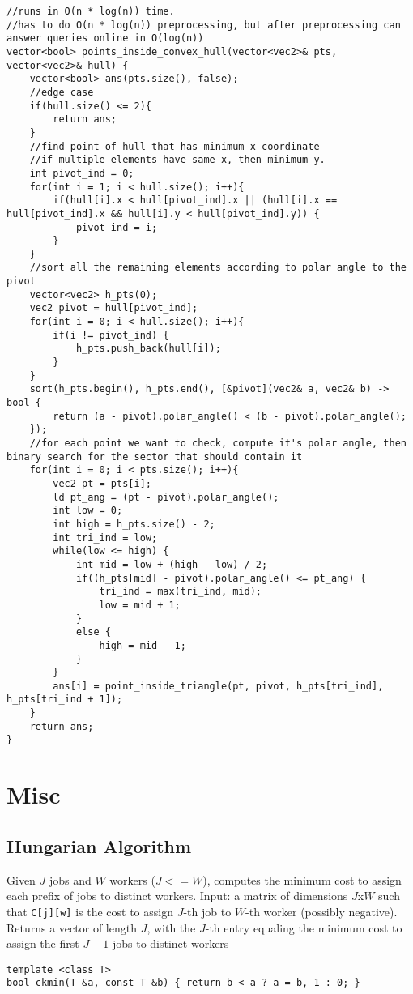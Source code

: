 \documentclass[8pt, headheight=10pt, a4paper]{article}
\begin{document}
\begin{multicols*}{3}
\begin{lstlisting}
//runs in O(n * log(n)) time. 
//has to do O(n * log(n)) preprocessing, but after preprocessing can answer queries online in O(log(n))
vector<bool> points_inside_convex_hull(vector<vec2>& pts, vector<vec2>& hull) {
    vector<bool> ans(pts.size(), false);
    //edge case
    if(hull.size() <= 2){
        return ans;
    }
    //find point of hull that has minimum x coordinate
    //if multiple elements have same x, then minimum y. 
    int pivot_ind = 0;
    for(int i = 1; i < hull.size(); i++){
        if(hull[i].x < hull[pivot_ind].x || (hull[i].x == hull[pivot_ind].x && hull[i].y < hull[pivot_ind].y)) {
            pivot_ind = i;
        }
    }
    //sort all the remaining elements according to polar angle to the pivot
    vector<vec2> h_pts(0);
    vec2 pivot = hull[pivot_ind];
    for(int i = 0; i < hull.size(); i++){
        if(i != pivot_ind) {
            h_pts.push_back(hull[i]);
        }
    }
    sort(h_pts.begin(), h_pts.end(), [&pivot](vec2& a, vec2& b) -> bool {
        return (a - pivot).polar_angle() < (b - pivot).polar_angle();
    });
    //for each point we want to check, compute it's polar angle, then binary search for the sector that should contain it
    for(int i = 0; i < pts.size(); i++){
        vec2 pt = pts[i];
        ld pt_ang = (pt - pivot).polar_angle();
        int low = 0;
        int high = h_pts.size() - 2;
        int tri_ind = low;
        while(low <= high) {
            int mid = low + (high - low) / 2;
            if((h_pts[mid] - pivot).polar_angle() <= pt_ang) {
                tri_ind = max(tri_ind, mid);
                low = mid + 1;
            }
            else {
                high = mid - 1;
            }
        }
        ans[i] = point_inside_triangle(pt, pivot, h_pts[tri_ind], h_pts[tri_ind + 1]);
    }
    return ans;
}
\end{lstlisting}

\section{Misc}
\subsection{Hungarian Algorithm}
Given $J$ jobs and $W$ workers ($J <= W$), computes the minimum cost to assign each prefix of jobs to distinct workers. Input: a matrix of dimensions $J$x$W$ such that \lstinline{C[j][w]} is the cost to assign $J$-th job to $W$-th worker (possibly negative). Returns a vector of length $J$, with the $J$-th entry equaling the minimum cost to assign the first $J+1$ jobs to distinct workers
\begin{lstlisting}
template <class T> 
bool ckmin(T &a, const T &b) { return b < a ? a = b, 1 : 0; }


\end{lstlisting}
\end{multicols*}
\end{document}
